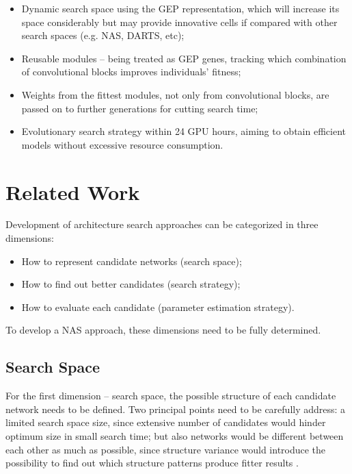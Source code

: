 \documentclass[conference]{IEEEtran}
\begin{document}
	
	\begin{itemize}
		\item Dynamic search space using the GEP representation, which will increase its space considerably but may provide innovative cells if compared with other search spaces (e.g. NAS, DARTS, etc);
		\item Reusable modules -- being treated as GEP genes, tracking which combination of convolutional blocks improves individuals' fitness;
		\item Weights from the fittest modules, not only from convolutional blocks, are passed on to further generations for cutting search time;
		\item Evolutionary search strategy within 24 GPU hours, aiming to obtain efficient models without excessive resource consumption.
	\end{itemize}
	
	
	\section{Related Work}
	
	Development of architecture search approaches can be categorized in three dimensions:  
	
	\begin{itemize}
		\item How to represent candidate networks (search space); \item How to find out better candidates (search strategy);
		\item How to evaluate each candidate (parameter estimation strategy).
	\end{itemize}
	
	To develop a NAS approach, these dimensions need to be fully determined.
	
	\subsection{Search Space}
	
	For the first dimension -- search space, the possible structure of each candidate network needs to be defined.
	Two principal points need to be carefully address: a limited search space size, since extensive number of candidates would hinder optimum size in small search time; but also networks would be different between each other as much as possible, since structure variance would introduce the possibility to find out which structure patterns produce fitter results \cite{elsken2018neural}.
	
\end{document}
